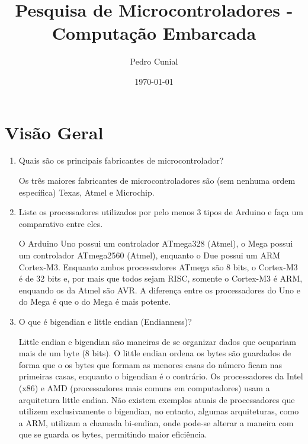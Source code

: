 \documentclass[11pt]{article}
\author{Pedro Cunial}
\date{\today}
\title{Pesquisa de Microcontroladores - Computação Embarcada}
\begin{document}
\maketitle

\section{Visão Geral}
\label{sec:orgheadline1}
\begin{enumerate}
  \item Quais são os principais fabricantes de microcontrolador?

    Os três maiores fabricantes de microcontroladores são (sem nenhuma ordem específica) Texas, Atmel e Microchip.

  \item Liste os processadores utilizados por pelo menos 3 tipos de Arduino e faça
    um comparativo entre eles.

    O Arduino Uno possui um controlador ATmega328 (Atmel), o Mega possui um
    controlador ATmega2560 (Atmel), enquanto o Due possui um ARM Cortex-M3.
    Enquanto ambos processadores ATmega são 8 bits, o Cortex-M3 é de 32 bits e,
    por mais que todos sejam RISC, somente o Cortex-M3 é ARM, enquando os da Atmel
    são AVR. A diferença entre os processadores do Uno e do Mega é que o do Mega é
    mais potente.

  \item O que é bigendian e little endian (Endianness)?

    Little endian e bigendian são maneiras de se organizar dados que ocupariam
    mais de um byte (8 bits). O little endian ordena os bytes são guardados de
    forma que o os bytes que formam as menores casas do número ficam nas primeiras
    casas, enquanto o bigendian é o contrário. Os processadores da Intel (x86) e
    AMD (processadores mais comuns em computadores) usam a arquitetura little
    endian. Não existem exemplos atuais de processadores que utilizem
    exclusivamente o bigendian, no entanto, algumas arquiteturas, como a ARM,
    utilizam a chamada bi-endian, onde pode-se alterar a maneira com que se guarda
    os bytes, permitindo maior eficiência.

\end{enumerate}
\end{document}

